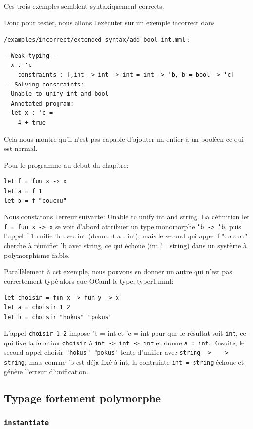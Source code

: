 Ces trois exemples semblent syntaxiquement corrects.

Donc pour tester, nous allons l'exécuter sur un exemple incorrect dans

\texttt{/examples/incorrect/extended\_syntax/add\_bool\_int.mml} :

\begin{lstlisting}
--Weak typing--
  x : 'c 
    constraints : [,int -> int -> int = int -> 'b,'b = bool -> 'c]
---Solving constraints:
  Unable to unify int and bool
  Annotated program:
  let x : 'c =
    4 + true
\end{lstlisting}

Cela nous montre qu'il n'est pas capable d'ajouter un entier à un booléen ce qui est normal.

Pour le programme au debut du chapitre:
\begin{lstlisting}
let f = fun x -> x
let a = f 1
let b = f "coucou"
\end{lstlisting}

Nous constatons l'erreur suivante: Unable to unify int and string.
La définition let \texttt{f = fun x -> x} se voit d’abord attribuer un type monomorphe \texttt{'b -> 'b}, puis l'appel f 1 unifie 'b avec int (donnant a : int), mais le second qui appel f "coucou" cherche à réunifier 'b avec string, ce qui échoue (int != string) dans un système à polymorphisme faible.

Parallèlement à cet exemple, nous pouvons en donner un autre qui n'est pas correctement typé alors que OCaml le
type, typer1.mml:

\begin{lstlisting}
let choisir = fun x -> fun y -> x
let a = choisir 1 2
let b = choisir "hokus" "pokus"
\end{lstlisting}

L'appel \texttt{choisir 1 2} impose 'b = int et 'c = int pour que le résultat soit \texttt{int}, ce qui fixe la fonction \texttt{choisir} à \texttt{int -> int -> int} et donne \texttt{a : int}.
Ensuite, le second appel choisir \texttt{"hokus" "pokus"} tente d'unifier avec \texttt{string -> \_ -> string}, mais comme 'b est déjà fixé à int, la contrainte \texttt{int = string} échoue et génère l'erreur d'unification.

\subsection{Typage fortement polymorphe}

\subsubsection{\texttt{instantiate}}

